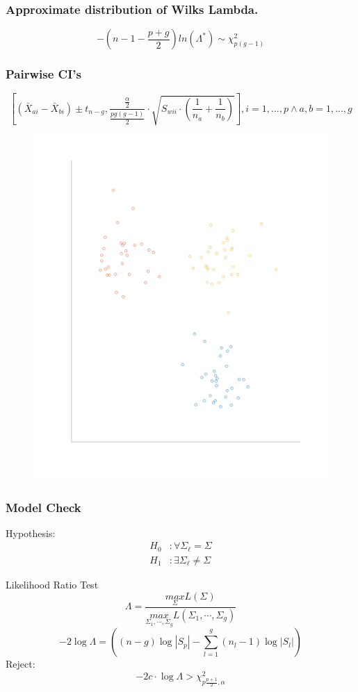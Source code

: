 \documentclass[aspectratio=169,10pt,t]{beamer}
\begin{document}
\begin{frame}[t]
	\frametitle{Approximate distribution of Wilks Lambda.}
	\[
		-\left(n-1-\frac{p+g}{2}\right)ln\left( \Lambda^*\right) \sim \chi^2_{p(g-1)}
	\]  
\end{frame}

\begin{frame}[t]
	\frametitle{Pairwise CI's}
	\[
		\left[
			( \bar{X}_{ai} - \bar{X}_{bi}  ) 
			\pm t_{n-g},
			\frac{\frac{\alpha }{2}}{ \frac{pg(g-1)}{2} } \cdot 
			\sqrt{S_{wii} \cdot \left(  \frac{1}{n_a} + \frac{1}{n_b}  \right) }
	\right] , i = 1,...,p \land a,b = 1,...,g
	\] 

	\begin{figure}[H]
		\includegraphics[scale=0.2]{clusters.png}
	\end{figure}
\end{frame}


\begin{frame}[t]
	\frametitle{Model Check}
	Hypothesis:
	\[
		\begin{aligned}
			H_0 &: \forall \Sigma_\ell = \Sigma\\
			H_1 &: \exists \Sigma_\ell \neq \Sigma
		\end{aligned}
	\] 

	Likelihood Ratio Test
	\[
		\Lambda = \frac{\underset{\Sigma}{max}L(\Sigma)}{\underset{\Sigma_1,\cdots,\Sigma_g}{max}L(\Sigma_1,\cdots,\Sigma_g)} 
	\] 
	\[
		-2\log\Lambda =  \left((n-g)\log|S_p| - \sum^{g}_{l=1}(n_l - 1) \log|S_l| \right) 
	\]
	Reject:
	\[
		-2c \cdot \log\Lambda > \chi^2_{p \frac{p+1}{2}, \alpha}
	\] 

\end{frame}
\end{document}
